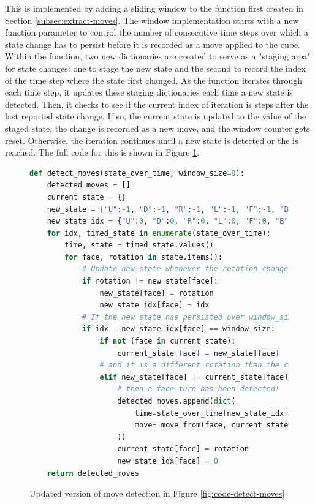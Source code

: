 This is implemented by adding a sliding window to the
 function first created in Section
\ref{subsec:extract-moves}. The window implementation starts with a new
 function parameter to control the number of
consecutive time steps over which a state change has to persist before
it is recorded as a move applied to the cube. Within the function, two
new dictionaries are created to serve as a "staging area" for state
changes: one to stage the new state and the second to record the index
of the time step where the state first changed. As the function
iterates through each time step, it updates these staging dictionaries
each time a new state is detected. Then, it checks to see if the
current index of iteration is  steps after the last
reported state change. If so, the current state is updated to the value
of the staged state, the change is recorded as a new move, and the
window counter gets reset. Otherwise, the iteration continues until a
new state is detected or the  is reached. The full
code for this is shown in Figure \ref{fig:code-detect-moves-new}.


\begin{figure}[h]
\caption{Updated version of move detection in Figure \ref{fig:code-detect-moves}}
\label{fig:code-detect-moves-new}
\begin{lstlisting}[language=Python, mathescape]
def detect_moves(state_over_time, window_size=8):                 # Edit
    detected_moves = []
    current_state = {}
    new_state = {"U":-1, "D":-1, "R":-1, "L":-1, "F":-1, "B":-1}  # New
    new_state_idx = {"U":0, "D":0, "R":0, "L":0, "F":0, "B":0}    # New
    for idx, timed_state in enumerate(state_over_time):
        time, state = timed_state.values()
        for face, rotation in state.items():
            # Update new_state whenever the rotation changes      # Edit $\downarrow$
            if rotation != new_state[face]:
                new_state[face] = rotation
                new_state_idx[face] = idx
            # If the new state has persisted over window_size time steps,
            if idx - new_state_idx[face] == window_size:
                if not (face in current_state):
                    current_state[face] = new_state[face]
                # and it is a different rotation than the current state,
                elif new_state[face] != current_state[face]:
                    # then a face turn has been detected!
                    detected_moves.append(dict(
                        time=state_over_time[new_state_idx[face]]["time"],
                        move=_move_from(face, current_state[face], rotation)
                    ))
                    current_state[face] = rotation
                    new_state_idx[face] = 0
    return detected_moves
\end{lstlisting}
\end{figure}


